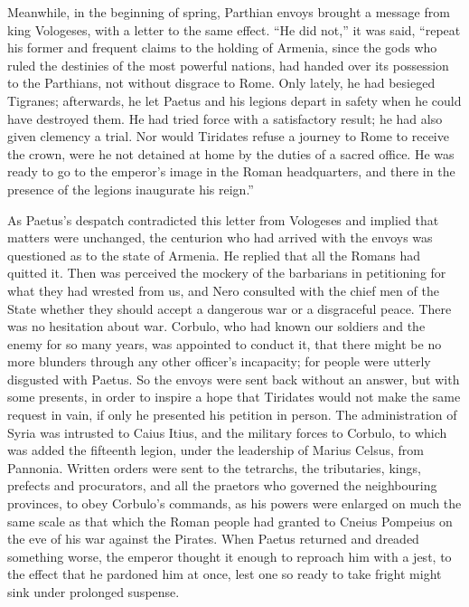 Meanwhile, in the beginning of spring, Parthian envoys brought a message from king Vologeses, with a letter to the same effect. ``He did not,'' it was said, ``repeat his former and frequent claims to the holding of Armenia, since the gods who ruled the destinies of the most powerful nations, had handed over its possession to the Parthians, not without disgrace to Rome. Only lately, he had besieged Tigranes; afterwards, he let Paetus and his legions depart in safety when he could have destroyed them. He had tried force with a satisfactory result; he had also given clemency a trial. Nor would Tiridates refuse a journey to Rome to receive the crown, were he not detained at home by the duties of a sacred office. He was ready to go to the emperor's image in the Roman headquarters, and there in the presence of the legions inaugurate his reign.''


As Paetus's despatch contradicted this letter from Vologeses and implied that matters were unchanged, the centurion who had arrived with the envoys was questioned as to the state of Armenia. He replied that all the Romans had quitted it. Then was perceived the mockery of the barbarians in petitioning for what they had wrested from us, and Nero consulted with the chief men of the State whether they should accept a dangerous war or a disgraceful peace. There was no hesitation about war. Corbulo, who had known our soldiers and the enemy for so many years, was appointed to conduct it, that there might be no more blunders through any other officer's incapacity; for people were utterly disgusted with Paetus. So the envoys were sent back without an answer, but with some presents, in order to inspire a hope that Tiridates would not make the same request in vain, if only he presented his petition in person. The administration of Syria was intrusted to Caius Itius, and the military forces to Corbulo, to which was added the fifteenth legion, under the leadership of Marius Celsus, from Pannonia. Written orders were sent to the tetrarchs, the tributaries, kings, prefects and procurators, and all the praetors who governed the neighbouring provinces, to obey Corbulo's commands, as his powers were enlarged on much the same scale as that which the Roman people had granted to Cneius Pompeius on the eve of his war against the Pirates. When Paetus returned and dreaded something worse, the emperor thought it enough to reproach him with a jest, to the effect that he pardoned him at once, lest one so ready to take fright might sink under prolonged suspense.

